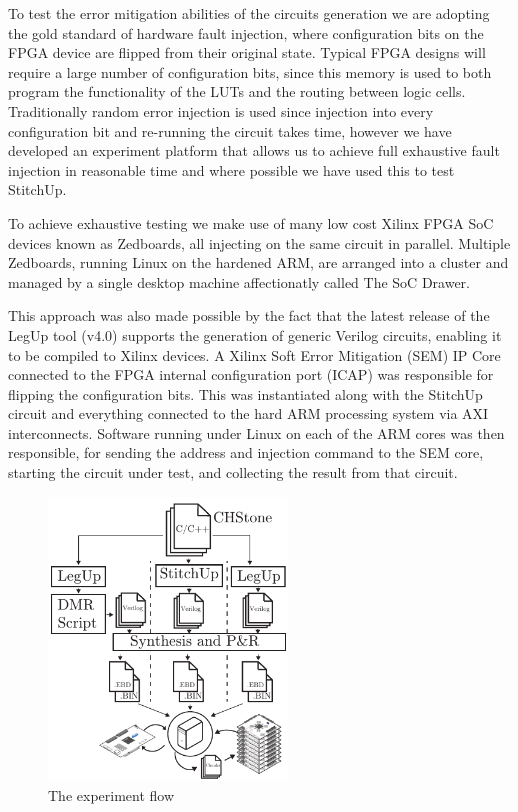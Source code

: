
To test the error mitigation abilities of the circuits generation we are adopting the
gold standard of hardware fault injection, where configuration bits on the 
FPGA device are flipped from their original state.
Typical FPGA designs will require a large number of configuration bits, since this
memory is used to both program the functionality of the LUTs and the routing between
logic cells.
Traditionally random error injection is used since injection into every configuration
bit and re-running the circuit takes time, however we have developed an experiment
platform that allows us to achieve full exhaustive fault injection in reasonable time
and where possible we have used this to test StitchUp.

To achieve exhaustive testing we make use of many low cost Xilinx FPGA SoC devices known as
Zedboards, all injecting on the same circuit in parallel.
Multiple Zedboards, running Linux on the hardened ARM, are arranged into a cluster and
managed by a single desktop machine affectionatly called The SoC Drawer.

This approach was also made possible by the fact that the latest release of the LegUp tool
(v4.0) supports the generation of generic Verilog circuits, enabling it to be compiled
to Xilinx devices.
A Xilinx Soft Error Mitigation (SEM) IP Core connected to the FPGA internal configuration
port (ICAP) was responsible for flipping the configuration bits.
This was instantiated along with the StitchUp circuit and everything connected to the hard
ARM processing system via AXI interconnects.  
Software running under Linux on each of the ARM cores was then responsible, for sending the
address and injection command to the SEM core, starting the circuit under test, and
collecting the result from that circuit. 

\begin{figure}[h]
\centering
\includegraphics[width=2.5in]{./imgs/ExperimentFlowVert.pdf}
\caption{The experiment flow}
\label{fig:ExperimentFlow}
\end{figure}


